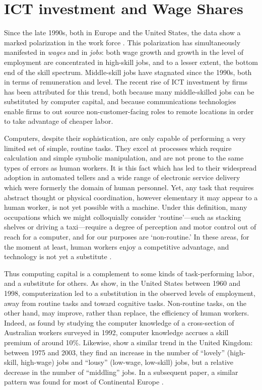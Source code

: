 \chapter{ICT investment and Wage Shares}


Since the late 1990s, both in Europe and the United States, the data show a marked polarization in the work force \citep{Goos2007, Autor2006}. This polarization has simultaneously manifested in \emph{wages} and in \emph{jobs}: both wage growth and growth in the level of employment are concentrated in high-skill jobs, and to a lesser extent, the bottom end of the skill spectrum. Middle-skill jobs have stagnated since the 1990s, both in terms of remuneration and level. The recent rise of ICT investment by firms has been attributed for this trend, both because many middle-skilled jobs can be substituted by computer capital, and because communications technologies enable firms to out source non-customer-facing roles to remote locations in order to take advantage of cheaper labor.

Computers, despite their sophistication, are only capable of performing a very limited set of simple, routine tasks. They excel at processes which require calculation and simple symbolic manipulation, and are not prone to the same types of errors as human workers. It is this fact which has led to their widespread adoption in automated tellers and a wide range of electronic service delivery which were formerly the domain of human personnel. Yet, any task that requires abstract thought or physical coordination, however elementary it may appear to a human worker, is not yet possible with a machine. Under this definition, many occupations which we might colloquially consider `routine'---such as stacking shelves or driving a taxi---require a degree of perception and motor control out of reach for a computer, and for our purposes are `non-routine.' In these areas, for the moment at least, human workers enjoy a competitive advantage, and technology is not yet a substitute \citep{Levy2003}.

Thus computing capital is a complement to some kinds of task-performing labor, and a substitute for others. As \citet{Levy2003} show, in the United States between 1960 and 1998, computerization led to a substitution in the observed levels of employment, away from routine tasks and toward cognitive tasks. Non-routine tasks, on the other hand, may improve, rather than replace, the efficiency of human workers. Indeed, as \citet{Borland2004} found by studying the computer knowledge of a cross-section of Australian workers surveyed in 1992, computer knowledge accrues a skill premium of around 10\%. Likewise, \citet{Goos2007} show a similar trend in the United Kingdom: between 1975 and 2003, they find an increase in the number of ``lovely'' (high-skill, high-wage) jobs and ``lousy'' (low-wage, low-skill) jobs, but a relative decrease in the number of ``middling'' jobs. In a subsequent paper, a similar pattern was found for most of Continental Europe \citep{Goos2009}.

